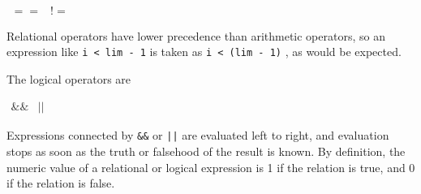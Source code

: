 \documentclass{scrartcl}
\begin{document}
$\begin{array}{ll}
== & !=
\end{array}$

            Relational operators have lower precedence than arithmetic operators,
            so an expression like \texttt{i < lim - 1} is taken as \texttt{i < (lim - 1)}
            , as would be expected.

            The logical operators are

$\begin{array}{ll}
\&\& & ||
\end{array}$

            Expressions connected by \texttt{\&\&} or \texttt{||} are evaluated
            left to right, and evaluation stops as soon as the truth or falsehood
            of the result is known. By definition, the numeric value of a relational
            or logical expression is 1 if the relation is true, and 0 if the relation
            is false.
\end{document}
